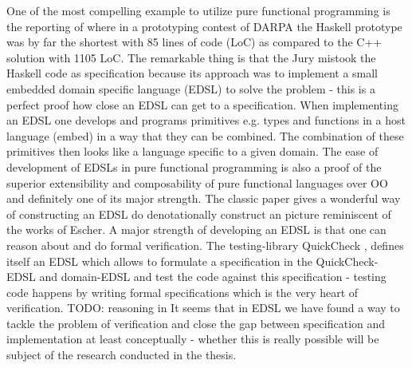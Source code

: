 One of the most compelling example to utilize pure functional programming is the reporting of \cite{hudak_haskell_1994} where in a prototyping contest of DARPA the Haskell prototype was by far the shortest with 85 lines of code (LoC) as compared to the C++ solution with 1105 LoC. The remarkable thing is that the Jury mistook the Haskell code as specification because its approach was to implement a small embedded domain specific language (EDSL) to solve the problem - this is a perfect proof how close an EDSL can get to a specification. When implementing an EDSL one develops and programs primitives e.g. types and functions in a host language (embed) in a way that they can be combined. The combination of these primitives then looks like a language specific to a given domain. The ease of development of EDSLs in pure functional programming is also a proof of the superior extensibility and composability of pure functional languages over OO and definitely one of its major strength. The classic paper \cite{henderson_functional_1982} gives a wonderful way of constructing an EDSL do denotationally construct an picture reminiscent of the works of Escher.
A major strength of developing an EDSL is that one can reason about and do formal verification. The testing-library QuickCheck \cite{claessen_quickcheck:_2000}, \cite{claessen_testing_2002} defines itself an EDSL which allows to formulate a specification in the QuickCheck- EDSL and domain-EDSL and test the code against this specification - testing code happens by writing formal specifications which is the very heart of verification. 
TODO: reasoning in \cite{hutton_tutorial_1999}
It seems that in EDSL we have found a way to tackle the problem of verification and close the gap between specification and implementation at least conceptually - whether this is really possible will be subject of the research conducted in the thesis.


